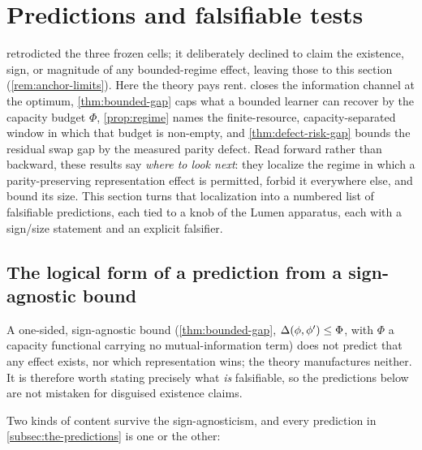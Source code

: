 \section{Predictions and falsifiable tests}
\label{sec:predictions}


 retrodicted the three frozen cells; it deliberately
declined to claim the existence, sign, or magnitude of any bounded-regime
effect, leaving those to this section (\cref{rem:anchor-limits}). Here the
theory pays rent.  closes the information channel at the
optimum, \cref{thm:bounded-gap} caps what a bounded learner can recover by the
capacity budget $\Phi$, \cref{prop:regime} names the finite-resource,
capacity-separated window in which that budget is non-empty, and
\cref{thm:defect-risk-gap} bounds the residual swap gap by the measured parity
defect. Read forward rather than backward, these results say \emph{where to
look next}: they localize the regime in which a parity-preserving
representation effect is permitted, forbid it everywhere else, and bound its
size. This section turns that localization into a numbered list of falsifiable
predictions, each tied to a knob of the Lumen apparatus, each with a sign/size
statement and an explicit falsifier.

\subsection{The logical form of a prediction from a sign-agnostic bound}
\label{subsec:pred-form}

A one-sided, sign-agnostic bound (\cref{thm:bounded-gap},
$\Delta(\phi,\phi')\le\Phi$, with $\Phi$ a capacity functional carrying no
mutual-information term) does not predict that any effect exists, nor which
representation wins; the theory manufactures neither. It is therefore
worth stating precisely what \emph{is} falsifiable, so the predictions below are
not mistaken for disguised existence claims.

Two kinds of content survive the sign-agnosticism, and every prediction in
\cref{subsec:the-predictions} is one or the other:


